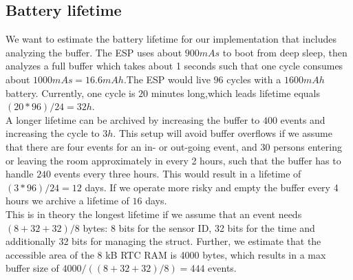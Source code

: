 \subsection{Battery lifetime}
We want to estimate the battery lifetime for our implementation that includes analyzing the buffer.
The ESP uses about $900 mAs$ to boot from deep sleep, then analyzes a full buffer which takes about
1 seconds such that one cycle consumes about $1000 mAs = 16.6 mAh$.The ESP would
live $96$ cycles with a $1600 mAh$ battery. Currently, one cycle is $20$ minutes long,which leads
lifetime equals $(20*96)/24 = 32 h$. \\
A longer lifetime can be archived by increasing the buffer to $400$
events and increasing the cycle to $3 h$. This setup will avoid buffer overflows if we assume that
there are four events for an in- or out-going event, and 30 persons entering or leaving the room
approximately in every 2 hours, such that the buffer has to handle $240$ events every three hours.
This would result in a lifetime of $(3*96)/24 = 12$ days. If we operate more risky and
empty the buffer every 4 hours we archive a lifetime of $16$ days.\\
This is in theory the longest lifetime if we assume that an event needs $(8+32+32)/8$ bytes:
8 bits for the sensor ID, 32 bits for the time and additionally 32 bits for managing the struct.
Further, we estimate that the accessible area of the 8 kB RTC RAM is 4000 bytes, which
results in a max buffer size of $4000/((8+32+32)/8) = 444$ events.
